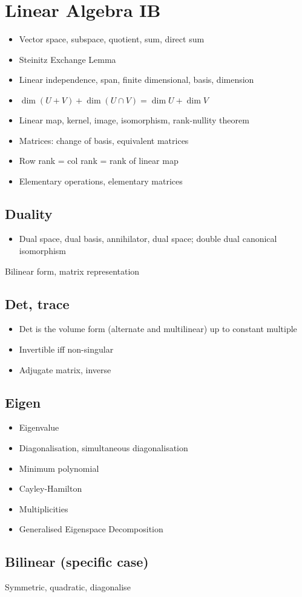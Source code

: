 


\section*{Linear Algebra \hfill IB}

\begin{itemize}
    \item Vector space, subspace, quotient, sum, direct sum
    \item Steinitz Exchange Lemma
    \item Linear independence, span, finite dimensional, basis, dimension
    \item $\dim(U+V) + \dim(U \cap V) = \dim U + \dim V$
    \item Linear map, kernel, image, isomorphism, rank-nullity theorem
    \item Matrices: change of basis, equivalent matrices
    \item Row rank = col rank = rank of linear map
    \item Elementary operations, elementary matrices
\end{itemize}

\subsection*{Duality}
\begin{itemize}
    \item Dual space, dual basis, annihilator, dual space; double dual canonical isomorphism
\end{itemize}
Bilinear form, matrix representation
\subsection*{Det, trace}
\begin{itemize}
    \item Det is the volume form (alternate and multilinear) up to constant multiple
    \item Invertible iff non-singular
    \item Adjugate matrix, inverse
\end{itemize}
\subsection*{Eigen}
\begin{itemize}
    \item Eigenvalue
    \item Diagonalisation, simultaneous diagonalisation
    \item Minimum polynomial
    \item Cayley-Hamilton
    \item Multiplicities
    \item Generalised Eigenspace Decomposition
\end{itemize}

\subsection*{Bilinear (specific case)}
Symmetric, quadratic, diagonalise


